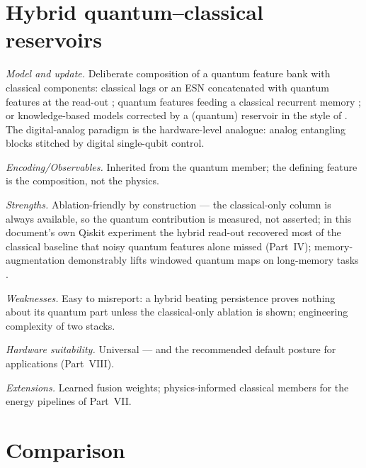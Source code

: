 \section{Hybrid quantum--classical reservoirs}
\label{sec:arch-hybrid}

\emph{Model and update.} Deliberate composition of a quantum feature bank with
classical components: classical lags or an ESN concatenated with quantum
features at the read-out \citep{settino2025memory,pfeffer2022hybrid}; quantum
features feeding a classical recurrent memory
\citep{wudarski2023hybrid}; or knowledge-based models corrected by a
(quantum) reservoir in the style of \citet{pathak2018hybrid}. The
digital-analog paradigm \citep{parra2020digital} is the hardware-level
analogue: analog entangling blocks stitched by digital single-qubit control.

\emph{Encoding/Observables.} Inherited from the quantum member; the defining
feature is the composition, not the physics.

\emph{Strengths.} Ablation-friendly by construction --- the classical-only
column is always available, so the quantum contribution is measured, not
asserted; in this document's own Qiskit experiment the hybrid read-out
recovered most of the classical baseline that noisy quantum features alone
missed (Part~IV); memory-augmentation demonstrably lifts windowed quantum
maps on long-memory tasks \citep{settino2025memory}.

\emph{Weaknesses.} Easy to misreport: a hybrid beating persistence proves
nothing about its quantum part unless the classical-only ablation is shown;
engineering complexity of two stacks.

\emph{Hardware suitability.} Universal --- and the recommended default posture
for applications (Part~VIII).

\emph{Extensions.} Learned fusion weights; physics-informed classical members
for the energy pipelines of Part~VII.

\section{Comparison}
\label{sec:arch-comparison}

